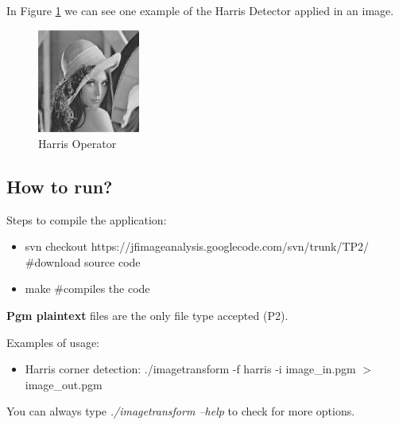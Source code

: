 \documentclass{article}
\begin{document}
	In Figure \ref{fig:harris} we can see one example of the Harris Detector applied in an image.

	\begin{figure}[H]
	\centering
	\includegraphics[width=0.3\textwidth]{../img/lennaharris}
	\caption{Harris Operator}
	\label{fig:harris}
	\end{figure}
	
	\subsection{How to run?}

	Steps to compile the application:
	
	\begin{itemize}
		\item svn checkout https://jfimageanalysis.googlecode.com/svn/trunk/TP2/ \#download source code
		\item make \#compiles the code
	\end{itemize}

	{\bf Pgm plaintext} files are the only file type accepted (P2). 

	Examples of usage:

	\begin{itemize}
		\item Harris corner detection:
		\subitem ./imagetransform -f harris -i image\_in.pgm $>$ image\_out.pgm
	\end{itemize}

	You can always type {\it ./imagetransform --help} to check for more options. 
\end{document}

